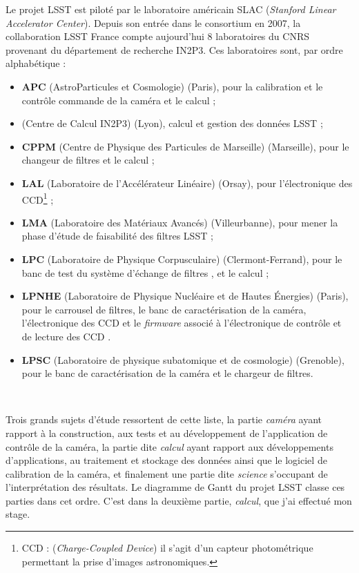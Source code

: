 Le projet LSST est piloté par le laboratoire américain SLAC (\emph{Stanford Linear Accelerator Center}). Depuis son entrée dans le consortium en 2007, la collaboration LSST France compte aujourd'hui 8 laboratoires du CNRS provenant du département de recherche IN2P3. Ces laboratoires sont, par ordre alphabétique :
	\begin{itemize}
		\item \textbf{APC} (AstroParticules et Cosmologie) (Paris), pour la calibration et le contrôle commande de la caméra et le calcul ;
		\item \textbf{\CC} (Centre de Calcul IN2P3) (Lyon), calcul et gestion des données LSST ;
		\item \textbf{CPPM} (Centre de Physique des Particules de Marseille) (Marseille), pour le changeur de filtres et le calcul ;
		\item \textbf{LAL} (Laboratoire de l'Accélérateur Linéaire) (Orsay), pour l'électronique des CCD\footnote{CCD : (\emph{Charge-Coupled Device}) il s'agit d'un capteur photométrique permettant la prise d'images astronomiques.} ;
		\item \textbf{LMA} (Laboratoire des Matériaux Avancés) (Villeurbanne), pour mener la phase d'étude de faisabilité des filtres LSST ;
		\item \textbf{LPC} (Laboratoire de Physique Corpusculaire) (Clermont-Ferrand), pour le banc de test du système d'échange de filtres , et le calcul ;
		\item \textbf{LPNHE} (Laboratoire de Physique Nucléaire et de Hautes Énergies) (Paris), pour le carrousel de filtres, le banc de caractérisation de la caméra, l'électronique des CCD et le \emph{firmware} associé à l'électronique de contrôle et de lecture des CCD .
		\item \textbf{LPSC} (Laboratoire de physique subatomique et de cosmologie) (Grenoble), pour le banc de caractérisation de la caméra et le chargeur de filtres.
	\end{itemize}

\

Trois grands sujets d'étude ressortent de cette liste, la partie \emph{caméra} ayant rapport à la construction, aux tests et au développement de l'application de contrôle de la caméra, la partie dite \emph{calcul} ayant rapport aux développements d'applications, au traitement et stockage des données ainsi que le logiciel de calibration de la caméra, et finalement une partie dite \emph{science} s'occupant de l'interprétation des résultats. Le diagramme de Gantt du projet LSST classe ces parties dans cet ordre. C'est dans la deuxième partie, \emph{calcul}, que j'ai effectué mon stage.


